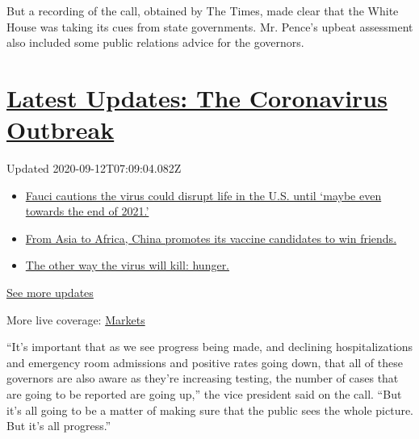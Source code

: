 But a recording of the call, obtained by The Times, made clear that the
White House was taking its cues from state governments. Mr. Pence's
upbeat assessment also included some public relations advice for the
governors.

\hypertarget{latest-updates-the-coronavirus-outbreak}{%
\section{\texorpdfstring{\href{https://www.nytimes3xbfgragh.onion/2020/09/11/world/covid-19-coronavirus.html?action=click\&pgtype=Article\&state=default\&region=MAIN_CONTENT_1\&context=storylines_live_updates}{Latest
Updates: The Coronavirus
Outbreak}}{Latest Updates: The Coronavirus Outbreak}}\label{latest-updates-the-coronavirus-outbreak}}

Updated 2020-09-12T07:09:04.082Z

\begin{itemize}
\tightlist
\item
  \href{https://www.nytimes3xbfgragh.onion/2020/09/11/world/covid-19-coronavirus.html?action=click\&pgtype=Article\&state=default\&region=MAIN_CONTENT_1\&context=storylines_live_updates\#link-dfb8a16}{Fauci
  cautions the virus could disrupt life in the U.S. until `maybe even
  towards the end of 2021.'}
\item
  \href{https://www.nytimes3xbfgragh.onion/2020/09/11/world/covid-19-coronavirus.html?action=click\&pgtype=Article\&state=default\&region=MAIN_CONTENT_1\&context=storylines_live_updates\#link-7104d154}{From
  Asia to Africa, China promotes its vaccine candidates to win friends.}
\item
  \href{https://www.nytimes3xbfgragh.onion/2020/09/11/world/covid-19-coronavirus.html?action=click\&pgtype=Article\&state=default\&region=MAIN_CONTENT_1\&context=storylines_live_updates\#link-393ad215}{The
  other way the virus will kill: hunger.}
\end{itemize}

\href{https://www.nytimes3xbfgragh.onion/2020/09/11/world/covid-19-coronavirus.html?action=click\&pgtype=Article\&state=default\&region=MAIN_CONTENT_1\&context=storylines_live_updates}{See
more updates}

More live coverage:
\href{https://www.nytimes3xbfgragh.onion/live/2020/09/11/business/stock-market-today-coronavirus?action=click\&pgtype=Article\&state=default\&region=MAIN_CONTENT_1\&context=storylines_live_updates}{Markets}

``It's important that as we see progress being made, and declining
hospitalizations and emergency room admissions and positive rates going
down, that all of these governors are also aware as they're increasing
testing, the number of cases that are going to be reported are going
up,'' the vice president said on the call. ``But it's all going to be a
matter of making sure that the public sees the whole picture. But it's
all progress.''

